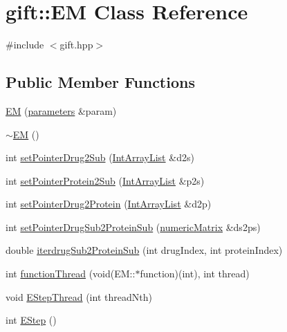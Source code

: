\hypertarget{classgift_1_1_e_m}{}\section{gift\+:\+:EM Class Reference}
\label{classgift_1_1_e_m}


{\ttfamily \#include $<$gift.\+hpp$>$}

\subsection*{Public Member Functions}
\begin{DoxyCompactItemize}
\item 
\hyperlink{classgift_1_1_e_m_a87148bb5a032a4c1d2cb40c3550cbfac}{EM} (\hyperlink{classgift_1_1parameters}{parameters} \&param)
\item 
\hyperlink{classgift_1_1_e_m_a89644e8f0be278e40a5c38931f6e30fe}{$\sim$\+EM} ()
\item 
int \hyperlink{classgift_1_1_e_m_a6801d3f3265e96e70b03b770575e5b73}{set\+Pointer\+Drug2\+Sub} (\hyperlink{namespacegift_a98b589c33d80e413fceaf8afd8e25815}{Int\+Array\+List} \&d2s)
\item 
int \hyperlink{classgift_1_1_e_m_ad6c15f101b9ddd7a0f45327479193d31}{set\+Pointer\+Protein2\+Sub} (\hyperlink{namespacegift_a98b589c33d80e413fceaf8afd8e25815}{Int\+Array\+List} \&p2s)
\item 
int \hyperlink{classgift_1_1_e_m_aa236e4028db6e992c455b8c7fb62e959}{set\+Pointer\+Drug2\+Protein} (\hyperlink{namespacegift_a98b589c33d80e413fceaf8afd8e25815}{Int\+Array\+List} \&d2p)
\item 
int \hyperlink{classgift_1_1_e_m_a1ded5e60b96c91af0494e7bab1f0eac7}{set\+Pointer\+Drug\+Sub2\+Protein\+Sub} (\hyperlink{namespacegift_a4e11987023733fe14bdabd0b52e78583}{numeric\+Matrix} \&ds2ps)
\item 
double \hyperlink{classgift_1_1_e_m_a863e912e64db27bae204f088649dee39}{iterdrug\+Sub2\+Protein\+Sub} (int drug\+Index, int protein\+Index)
\item 
int \hyperlink{classgift_1_1_e_m_a7904c67669cc200e87a0eda189b98e9e}{function\+Thread} (void(E\+M\+::$\ast$function)(int), int thread)
\item 
void \hyperlink{classgift_1_1_e_m_aed35010a7a836773e632d2ca8e73d69b}{E\+Step\+Thread} (int thread\+Nth)
\item 
int \hyperlink{classgift_1_1_e_m_ae362692fa8da7596544e0e484b44e6fb}{E\+Step} ()
\item 

\end{DoxyCompactItemize}
